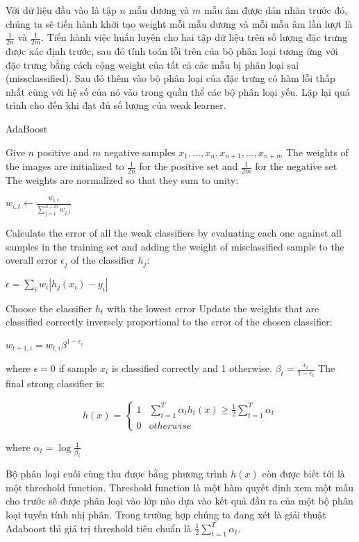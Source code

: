 \documentclass[12pt,a4paper]{article}
\begin{document}
Với dữ liệu đầu vào là tập $n$ mẫu dương và $m$ mẫu âm được dán nhãn trước đó, chúng ta sẽ tiến hành khởi tạo weight mỗi mẫu dương và mỗi mẫu âm lần lượt là $\frac{1}{2n}$ và $\frac{1}{2m}$. Tiến hành việc huấn luyện cho hai tập dữ liệu trên số lượng đặc trưng được xác định trước, sau đó tính toán lỗi trên của bộ phân loại tương ứng với đặc trưng bằng cách cộng weight của tất cả các mẫu bị phân loại sai (missclassified). Sau đó thêm vào bộ phân loại của đặc trưng có hàm lỗi thấp nhất cùng với hệ số của nó vào trong quần thể các bộ phân loại yếu. Lặp lại quá trình cho đến khi đạt đủ số lượng của weak learner.
\begin{algorithm}[H]
\caption{AdaBoost}
\begin{algorithmic}[1]
\STATE Give $n$ positive and $m$ negative samples $x_1,...,x_n, x_{n+1},...,x_{n+m}$
\STATE The weights of the images are initialized to $\frac{1}{2n}$ for the positive set and $\frac{1}{2m}$ for the negative set
\STATE The weights are normalized so that they sum to unity: \\
\begin{center}
$w_{i, t} \leftarrow \frac{w_{i,t}}{\sum_{j=1}^{n+m} w_{j,t}}$
\end{center}
\STATE Calculate the error of all the weak classifiers by evaluating each one against all samples in the training set and adding the weight of misclassified sample to the overall error $\epsilon_j$ of the classifier $h_j$:\\
\begin{center}
 $\epsilon = \sum_{i}w_i|h_j(x_i) - y_i|$
 \end{center}
\STATE Choose the classifier $h_t$ with the lowest error
\STATE Update the weights that are classified correctly inversely proportional to the error of the chosen classifier:\\
\begin{center}
    $w_{t+1,i} = w_{t,i}\beta^{1 - \epsilon_i}$ \\
\end{center}

where $\epsilon = 0$ if sample $x_i$ is classified correctly and 1 otherwise. $\beta_t = \frac{\epsilon_t}{1-\epsilon_t}$
\ENDFOR
\STATE The final strong classifier is:
\begin{center}
    $$h(x) = \begin{cases} 1 & \sum_{t=1}^T\alpha_th_t(x) \geq \frac{1}{2}\sum_{t=1}^T\alpha_t\\
    0 & otherwise \end{cases} $$
\end{center}
where $\alpha_t = \log\frac{1}{\beta_t}$
\end{algorithmic}
\end{algorithm}
Bộ phân loại cuối cùng thu được bằng phương trình $h(x)$ còn được biết tới là một threshold function. Threshold function là một hàm quyết định xem một mẫu cho trước sẽ được phân loại vào lớp nào dựa vào kết quả đầu ra của một bộ phân loại tuyến tính nhị phân. Trong trường hợp chúng ta đang xét là giải thuật Adaboost thì giá trị threshold tiêu chuẩn là $\frac{1}{2}\sum_{t=1}^T\alpha_t$.
\end{document}
